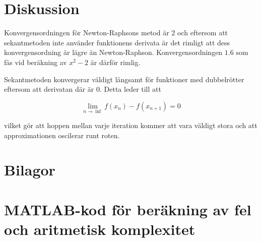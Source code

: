 \documentclass[a4paper,titlepage]{article}
\begin{document}
\section{Diskussion}

Konvergensordningen för Newton-Raphsons metod är 2 och eftersom att sekantmetoden
inte använder funktionens derivata är det rimligt att dess konvergensordning är lägre
än Newton-Raphson. Konvergensordningen $1.6$ som fås vid beräkning av $x^2-2$ är
därför rimlig.

Sekantmetoden konvergerar väldigt långsamt för funktioner med dubbelrötter eftersom
att derivatan där är 0. Detta leder till att

\[
    \lim_{n \to \inf} f(x_n) - f(x_{n+1}) = 0
\]

vilket gör att hoppen mellan varje iteration kommer att vara väldigt stora och att
approximationen oscilerar runt roten.

\section*{Bilagor}
\appendix

\section{MATLAB-kod för beräkning av fel och aritmetisk komplexitet}
\label{sec:testcode}
\end{document}

